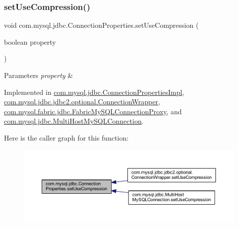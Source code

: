 \subsubsection{\texorpdfstring{set\+Use\+Compression()}{setUseCompression()}}
{\footnotesize\ttfamily void com.\+mysql.\+jdbc.\+Connection\+Properties.\+set\+Use\+Compression (\begin{DoxyParamCaption}\item[{boolean}]{property }\end{DoxyParamCaption})}


\begin{DoxyParams}{Parameters}
{\em property} & \\
\hline
\end{DoxyParams}


Implemented in \mbox{\hyperlink{classcom_1_1mysql_1_1jdbc_1_1_connection_properties_impl_aafc68e81ecc49c1956434bd142d5ca1a}{com.\+mysql.\+jdbc.\+Connection\+Properties\+Impl}}, \mbox{\hyperlink{classcom_1_1mysql_1_1jdbc_1_1jdbc2_1_1optional_1_1_connection_wrapper_a23ee905e6cb31af58b1cfc66edbd2050}{com.\+mysql.\+jdbc.\+jdbc2.\+optional.\+Connection\+Wrapper}}, \mbox{\hyperlink{classcom_1_1mysql_1_1fabric_1_1jdbc_1_1_fabric_my_s_q_l_connection_proxy_aa5dcd26ff1606ab91066f970965f1326}{com.\+mysql.\+fabric.\+jdbc.\+Fabric\+My\+S\+Q\+L\+Connection\+Proxy}}, and \mbox{\hyperlink{classcom_1_1mysql_1_1jdbc_1_1_multi_host_my_s_q_l_connection_ac6291b99cbc9ae36778e00c3c95603b2}{com.\+mysql.\+jdbc.\+Multi\+Host\+My\+S\+Q\+L\+Connection}}.

Here is the caller graph for this function\+:\nopagebreak
\begin{figure}[H]
\begin{center}
\leavevmode
\includegraphics[width=350pt]{interfacecom_1_1mysql_1_1jdbc_1_1_connection_properties_a60f864890c4947c6a45fb0d99cc7c78d_icgraph}
\end{center}
\end{figure}
\mbox{\label{interfacecom_1_1mysql_1_1jdbc_1_1_connection_properties_a64d13f1fe9290e34ad189fd0eb13b81d}} 
